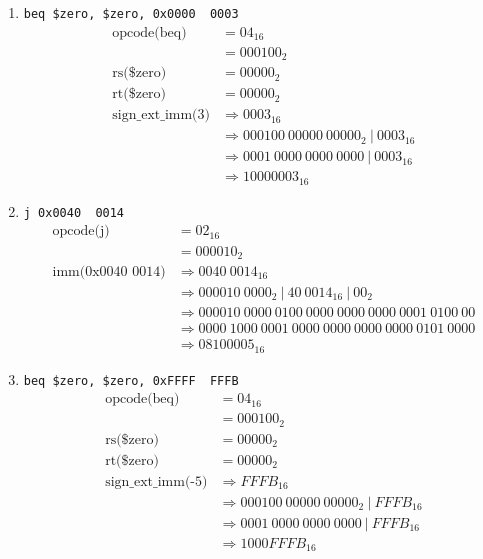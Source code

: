 \documentclass[12pt]{article}
\begin{document}
\begin{enumerate}
\begin{enumerate}
      \item \texttt{beq \$zero, \$zero, 0x0000 \ 0003}
      \begin{align*}
        \text{opcode(beq)} &= 04_{16} \\
        &= 000100_2\\
        \text{rs(\$zero)} &= 00000_2 \\
        \text{rt(\$zero)} &= 00000_2 \\
        \text{sign\_ext\_imm(3)} &\Rightarrow 0003_{16}\\
        &\Rightarrow 000100 \ 00000 \ 00000_2 \ | \ 0003_{16}\\
        &\Rightarrow 0001 \ 0000 \ 0000 \ 0000 \ | \ 0003_{16}\\
        &\Rightarrow 10000003_{16}
      \end{align*}

      \item \texttt{j 0x0040 \ 0014}
      \begin{align*}
        \text{opcode(j)} &= 02_{16} \\
        &= 000010_2\\
        \text{imm(0x0040 \ 0014)} &\Rightarrow 0040 \ 0014_{16}\\
        &\Rightarrow 000010 \ 0000_2 \ | \ 40 \ 0014_{16} \ | \ 00_2 \\
        &\Rightarrow 000010 \ 0000 \ 0100  \ 0000 \ 0000 \ 0000 \ 0001 \ 0100 \ 00 \\
        &\Rightarrow 0000 \ 1000 \ 0001 \ 0000 \ 0000 \ 0000 \ 0000 \ 0101 \ 0000\\
        &\Rightarrow 08100005_{16}
      \end{align*}

      \setcounter{enumi}{5}
      \item \texttt{beq \$zero, \$zero, 0xFFFF \ FFFB}
      \begin{align*}
        \text{opcode(beq)} &= 04_{16} \\
        &= 000100_2\\
        \text{rs(\$zero)} &= 00000_2 \\
        \text{rt(\$zero)} &= 00000_2 \\
        \text{sign\_ext\_imm(-5)} &\Rightarrow FFFB_{16}\\
        &\Rightarrow 000100 \ 00000 \ 00000_2 \ | \ FFFB_{16}\\
        &\Rightarrow 0001 \ 0000 \ 0000 \ 0000 \ | \ FFFB_{16}\\
        &\Rightarrow 1000FFFB_{16}
      \end{align*}


\end{enumerate}
\end{enumerate}
\end{document}
